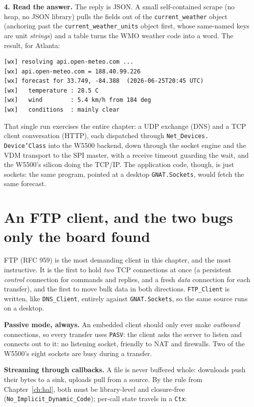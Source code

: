 \textbf{4. Read the answer.} The reply is JSON. A small self-contained scrape (no
heap, no JSON library) pulls the fields out of the \texttt{current\_weather}
object (anchoring past the \texttt{current\_weather\_units} object first, whose
same-named keys are unit \emph{strings}) and a table turns the WMO weather code
into a word. The result, for Atlanta:

\begin{lstlisting}[style=sh]
[wx] resolving api.open-meteo.com ...
[wx] api.open-meteo.com = 188.40.99.226
[wx] forecast for 33.749, -84.388  (2026-06-25T20:45 UTC)
[wx]   temperature : 28.5 C
[wx]   wind        : 5.4 km/h from 184 deg
[wx]   conditions  : mainly clear
\end{lstlisting}

That single run exercises the entire chapter: a UDP exchange (DNS) and a TCP
client conversation (HTTP), each dispatched through \texttt{Net\_Devices.%
Device'Class} into the W5500 backend, down through the socket engine and the VDM
transport to the SPI master, with a receive timeout guarding the wait, and the
W5500's silicon doing the TCP/IP. The application code, though, is just sockets:
the same program, pointed at a desktop \texttt{GNAT.Sockets}, would fetch the same
forecast.

\section{An FTP client, and the two bugs only the board found}
\label{ch:net:ftp}

FTP (RFC 959) is the most demanding client in this chapter, and the most
instructive. It is the first to hold \emph{two} TCP connections at once (a
persistent \emph{control} connection for commands and replies, and a fresh
\emph{data} connection for each transfer), and the first to move bulk data in
both directions. \texttt{FTP\_Client} is written, like \texttt{DNS\_Client},
entirely against \texttt{GNAT.Sockets}, so the same source runs on a desktop.

\textbf{Passive mode, always.} An embedded client should only ever make
\emph{outbound} connections, so every transfer uses \texttt{PASV}: the client asks
the server to listen and connects out to it: no listening socket, friendly to
NAT and firewalls. Two of the W5500's eight sockets are busy during a transfer.

\textbf{Streaming through callbacks.} A file is never buffered whole: downloads
push their bytes to a sink, uploads pull from a source. By the rule from
Chapter~\ref{ch:hal}, both must be library-level and closure-free
(\texttt{No\_Implicit\_Dynamic\_Code}); per-call state travels in a \texttt{Ctx}:

